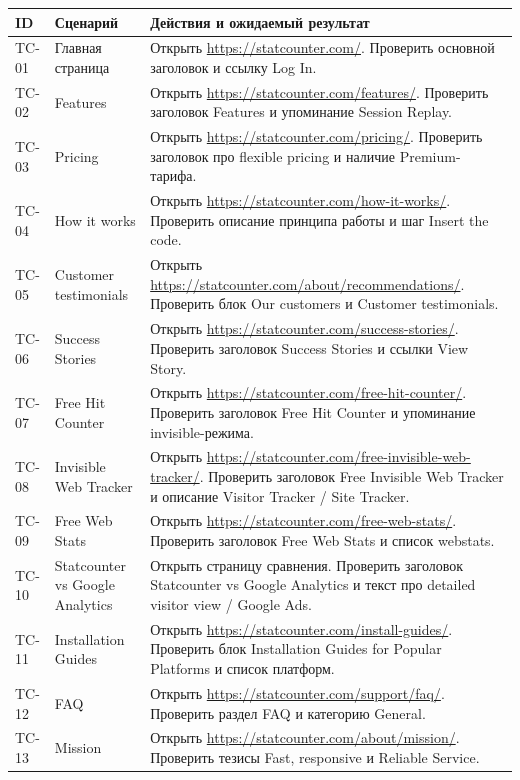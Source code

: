 \documentclass[12pt,a4paper]{report}
\begin{document}
\begin{longtable}{|p{1.5cm}|p{3.9cm}|p{8.8cm}|}
\hline
\textbf{ID} & \textbf{Сценарий} & \textbf{Действия и ожидаемый результат} \\
\hline
TC-01 & Главная страница & Открыть \url{https://statcounter.com/}. Проверить основной заголовок и ссылку Log In. \\
\hline
TC-02 & Features & Открыть \url{https://statcounter.com/features/}. Проверить заголовок Features и упоминание Session Replay. \\
\hline
TC-03 & Pricing & Открыть \url{https://statcounter.com/pricing/}. Проверить заголовок про flexible pricing и наличие Premium-тарифа. \\
\hline
TC-04 & How it works & Открыть \url{https://statcounter.com/how-it-works/}. Проверить описание принципа работы и шаг Insert the code. \\
\hline
TC-05 & Customer testimonials & Открыть \url{https://statcounter.com/about/recommendations/}. Проверить блок Our customers и Customer testimonials. \\
\hline
TC-06 & Success Stories & Открыть \url{https://statcounter.com/success-stories/}. Проверить заголовок Success Stories и ссылки View Story. \\
\hline
TC-07 & Free Hit Counter & Открыть \url{https://statcounter.com/free-hit-counter/}. Проверить заголовок Free Hit Counter и упоминание invisible-режима. \\
\hline
TC-08 & Invisible Web Tracker & Открыть \url{https://statcounter.com/free-invisible-web-tracker/}. Проверить заголовок Free Invisible Web Tracker и описание Visitor Tracker / Site Tracker. \\
\hline
TC-09 & Free Web Stats & Открыть \url{https://statcounter.com/free-web-stats/}. Проверить заголовок Free Web Stats и список webstats. \\
\hline
TC-10 & Statcounter vs Google Analytics & Открыть страницу сравнения. Проверить заголовок Statcounter vs Google Analytics и текст про detailed visitor view / Google Ads. \\
\hline
TC-11 & Installation Guides & Открыть \url{https://statcounter.com/install-guides/}. Проверить блок Installation Guides for Popular Platforms и список платформ. \\
\hline
TC-12 & FAQ & Открыть \url{https://statcounter.com/support/faq/}. Проверить раздел FAQ и категорию General. \\
\hline
TC-13 & Mission & Открыть \url{https://statcounter.com/about/mission/}. Проверить тезисы Fast, responsive и Reliable Service. \\

\end{longtable}
\end{document}
